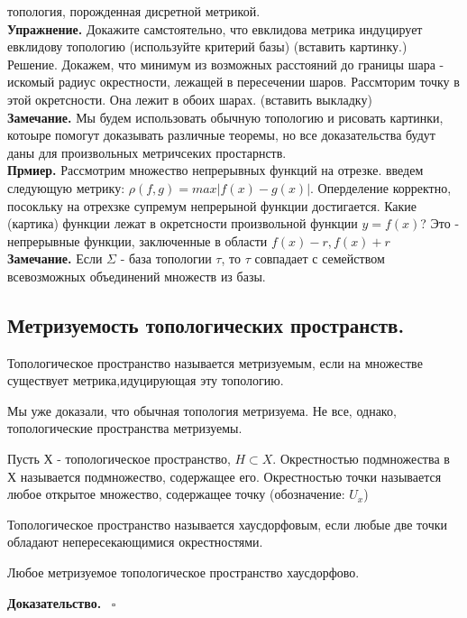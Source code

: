 топология, порожденная дисретной метрикой.\\
\textbf{Упражнение.} Докажите самстоятельно, что евклидова метрика индуцирует
евклидову топологию (используйте критерий базы) (вставить картинку.)\\
Решение. Докажем, что минимум из возможных расстояний до границы шара - 
искомый радиус окрестности, лежащей в пересечении шаров. Рассмторим
точку в этой окретсности. Она лежит в обоих шарах. (вставить выкладку)\\
\textbf{Замечание.} Мы будем использовать обычную топологию и рисовать 
картинки, котоыре помогут доказывать различные теоремы, но все доказательства
будут даны для произвольных метричсеких простарнств. \\
\textbf{Прмиер.} Рассмотрим множество непрерывных функций на отрезке. 
введем следующую метрику: $\rho(f,g)=max|f(x)-g(x)|$. Оперделение
корректно, посокльку на отрехзке супремум непрерыной функции достигается. 
Какие (картика) функции лежат в окретсности произвольной функции $y=f(x)$?
Это - непрерывные функции, заключенные в области $f(x)-r,f(x)+r$\\
\textbf{Замечание.} Если $\Sigma$ - база топологии  $\tau$, то  $\tau$
совпадает с семейством всевозможных объединений множеств из базы.
\subsection{Метризуемость топологических пространств.}
\begin{defin}
    Топологическое пространство называется метризуемым, если на множестве 
    существует метрика,идуцирующая эту топологию.
\end{defin}
Мы уже доказали, что обычная топология метризуема. Не все, однако, 
топологические пространства метризуемы. 
\begin{defin}
Пусть Х - топологическое пространство, $H\subset X$. Окрестностью 
подмножества в Х называется подмножество, содержащее его. 
Окрестностью точки называется любое открытое множество, содержащее точку
(обозначение: $U_x$)
\end{defin}
\begin{defin}
Топологическое пространство называется хаусдорфовым, если любые две точки 
обладают непересекающимися окрестностями. 
\end{defin}
\begin{theor}
Любое метризуемое топологическое пространство хаусдорфово.
\end{theor}
\textbf{Доказательство.}  \
$\square$ 












